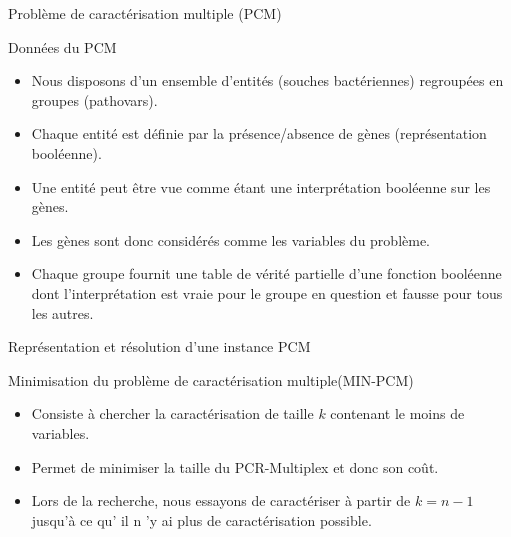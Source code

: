 \documentclass{beamer}
\begin{document}
\begin{frame}{Problème de caractérisation multiple (PCM)}
	\begin{block}{Données du PCM}
		\begin{itemize}
			\item Nous disposons d'un ensemble d'entités (souches bactériennes) regroupées en groupes (pathovars).
			\pause
			\item Chaque entité est définie par la présence/absence de gènes (représentation booléenne).
			\pause
			\item Une entité peut être vue comme étant une interprétation booléenne sur les gènes.
			\pause
			\item Les gènes sont donc considérés comme les variables du problème.
			\pause
			\item Chaque groupe fournit une table de vérité partielle d'une fonction booléenne dont l'interprétation est vraie pour le groupe en question et fausse pour tous les autres.  
		\end{itemize}
	\end{block}
\end{frame}

\begin{frame}{Représentation et résolution d'une instance PCM}
	\vspace{0.5cm}
	
\end{frame}

\begin{frame}{}
	\begin{block}{Minimisation du problème de caractérisation multiple(MIN-PCM)}
		\begin{itemize}
			\item Consiste à chercher la caractérisation de taille $k$ contenant le moins de variables.
			\pause
			\item Permet de minimiser la taille du PCR-Multiplex et donc son coût.
			\pause
			\item Lors de la recherche, nous essayons de caractériser à partir de $k=n-1$ jusqu'à ce qu' il n 'y ai plus de caractérisation possible.
		\end{itemize}
	\end{block}
\end{frame}
\end{document}
